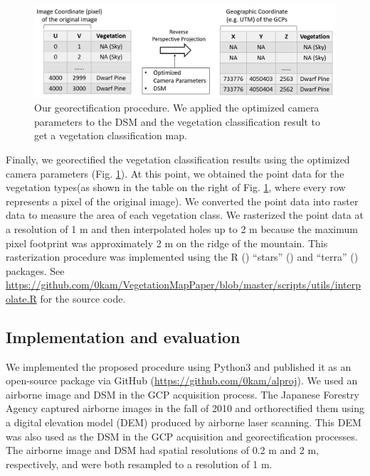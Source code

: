 \documentclass{article}
\begin{document}
\begin{figure}
\includegraphics[width=1\linewidth]{paper_files/figures/Slide6} \caption{Our georectification procedure. We applied the optimized camera parameters to the DSM and the vegetation classification result to get a vegetation classification map.}\label{fig:georec}
\end{figure}

Finally, we georectified the vegetation classification results using the optimized camera parameters (Fig. \ref{fig:georec}). At this point, we obtained the point data for the vegetation types(as shown in the table on the right of Fig. \ref{fig:georec}, where every row represents a pixel of the original image). We converted the point data into raster data to measure the area of each vegetation class. We rasterized the point data at a resolution of 1 m and then interpolated holes up to 2 m because the maximum pixel footprint was approximately 2 m on the ridge of the mountain. This rasterization procedure was implemented using the R  (\cite{Rcore}) ``stars''  (\cite{Rstars}) and ``terra'' (\cite{Rterra}) packages. See \url{https://github.com/0kam/VegetationMapPaper/blob/master/scripts/utils/interpolate.R} for the source code.

\hypertarget{implementation-and-evaluation}{%
\subsection{Implementation and evaluation}\label{implementation-and-evaluation}}

We implemented the proposed procedure using Python3 and published it as an open-source package via GitHub (\url{https://github.com/0kam/alproj}). We used an airborne image and DSM in the GCP acquisition process. The Japanese Forestry Agency captured airborne images in the fall of 2010 and orthorectified them using a digital elevation model (DEM) produced by airborne laser scanning. This DEM was also used as the DSM in the GCP acquisition and georectification processes. The airborne image and DSM had spatial resolutions of 0.2 m and 2 m, respectively, and were both resampled to a resolution of 1 m.
\end{document}
